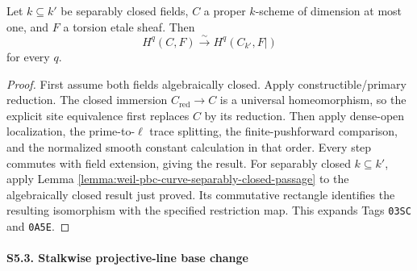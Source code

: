 \begin{proposition}
\label{prop:weil-pbc-proper-curve-sepclosed-invariance}
\uses{}

Let $k\subseteq k'$ be separably closed fields, $C$ a proper $k$-scheme of
dimension at most one, and $F$ a torsion etale sheaf.  Then
\[
 H^q(C,F)\xrightarrow{\sim}H^q(C_{k'},F|)
\]
for every $q$.
\end{proposition}
\begin{proof}

First assume both fields algebraically closed.  Apply constructible/primary
reduction.  The closed immersion $C_{\mathrm{red}}\to C$ is a universal
homeomorphism, so the explicit site equivalence first replaces $C$ by its
reduction.  Then apply dense-open localization, the prime-to-$\ell$ trace
splitting, the
finite-pushforward comparison, and the normalized smooth constant calculation
in that order.  Every step commutes with field extension, giving the result.
For separably closed $k\subseteq k'$, apply Lemma
\ref{lemma:weil-pbc-curve-separably-closed-passage} to the algebraically
closed result just proved.  Its commutative rectangle identifies the
resulting isomorphism with the specified restriction map.  This expands Tags
\texttt{03SC} and \texttt{0A5E}.
\end{proof}

\paragraph{S5.3. Stalkwise projective-line base change}

